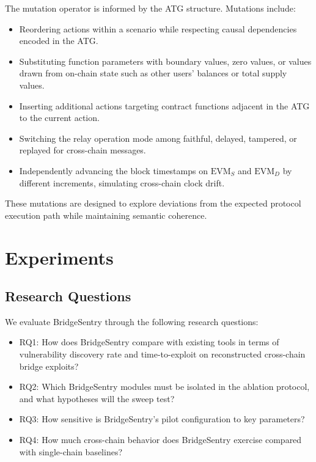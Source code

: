 \documentclass[journal]{IEEEtran}
\begin{document}
The mutation operator is informed by the ATG structure. Mutations include:

\begin{itemize}
    \item Reordering actions within a scenario while respecting causal dependencies encoded in the ATG.
    \item Substituting function parameters with boundary values, zero values, or values drawn from on-chain state such as other users' balances or total supply values.
    \item Inserting additional actions targeting contract functions adjacent in the ATG to the current action.
    \item Switching the relay operation mode among faithful, delayed, tampered, or replayed for cross-chain messages.
    \item Independently advancing the block timestamps on $\text{EVM}_S$ and $\text{EVM}_D$ by different increments, simulating cross-chain clock drift.
\end{itemize}

These mutations are designed to explore deviations from the expected protocol execution path while maintaining semantic coherence.

\section{Experiments}\label{sec:experiments}

\subsection{Research Questions}

We evaluate BridgeSentry through the following research questions:

\begin{itemize}
    \item RQ1: How does BridgeSentry compare with existing tools in terms of vulnerability discovery rate and time-to-exploit on reconstructed cross-chain bridge exploits?
    \item RQ2: Which BridgeSentry modules must be isolated in the ablation protocol, and what hypotheses will the sweep test?
    \item RQ3: How sensitive is BridgeSentry's pilot configuration to key parameters?
    \item RQ4: How much cross-chain behavior does BridgeSentry exercise compared with single-chain baselines?
\end{itemize}
\end{document}
